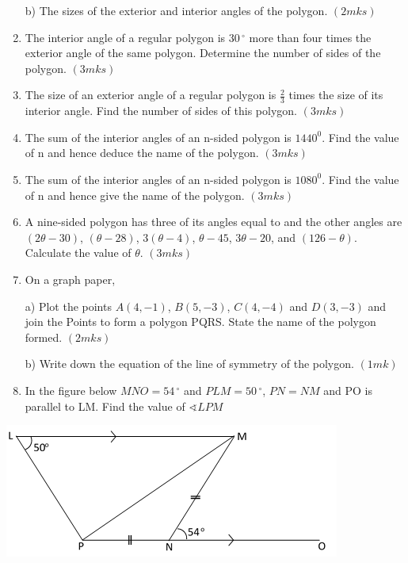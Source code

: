 \documentclass[
  a4paperpaper,
]{scrbook}
\begin{document}
\begin{tcolorbox}
\begin{enumerate}
  b) The sizes of the exterior and interior angles of the polygon.
  \hspace{3.3cm} \((2mks)\)
\item
  The interior angle of a regular polygon is \(30\,^{\circ}\) more than
  four times the exterior angle of the same polygon. Determine the
  number of sides of the polygon. \hspace{4cm} \((3mks)\)
\item
  The size of an exterior angle of a regular polygon is \(\frac{2}{3}\)
  times the size of its interior angle. Find the number of sides of this
  polygon. \hspace{8.2cm} \((3mks)\)
\item
  The sum of the interior angles of an n-sided polygon is \(1440^0\).
  Find the value of n and hence deduce the name of the polygon.
  \hspace{9cm} \((3mks)\)
\item
  The sum of the interior angles of an n-sided polygon is \(1080^0\).
  Find the value of n and hence give the name of the polygon.
  \hspace{10cm} \((3mks)\)
\item
  A nine-sided polygon has three of its angles equal to and the other
  angles are \((2\theta - 30)\), \((\theta- 28)\), \(3(\theta - 4)\),
  \(\theta -45\), \(3\theta-20\), and \((126 - \theta)\). Calculate the
  value of \(\theta\). \hspace{4.2cm} \((3mks)\)
\item
  On a graph paper,

  a) Plot the points \(A(4, -1)\), \(B(5, -3)\), \(C(4, -4)\) and
  \(D(3, -3)\) and join the Points to form a polygon PQRS. State the
  name of the polygon formed. \hspace{4.5cm} \((2mks)\)

  b) Write down the equation of the line of symmetry of the polygon.
  \hspace{3.2cm}\((1mk)\)
\item
  In the figure below \(MNO =54\,^{\circ}\) and \(PLM =50\,^{\circ}\),
  \(PN = NM\) and PO is parallel to LM. Find the value of
  \(\sphericalangle LPM\)
\end{enumerate}

\includegraphics{images/trapezia.png}

\end{tcolorbox}
\end{document}
